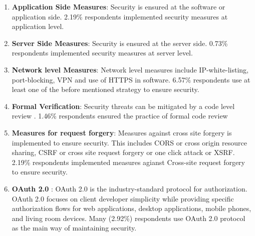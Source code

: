 \begin{enumerate}

    \item \textbf{Application Side Measures}: Security is ensured at the software or application side. 2.19\% respondents implemented security measures at application level.
    
    \item \textbf{Server Side Measures}: Security is ensured at the server side. 0.73\% respondents implemented security measures at server level.
    
    \item \textbf{Network level Measures}: Network level measures include IP-white-listing, port-blocking, VPN and  use of HTTPS  in software. 6.57\% respondents use at least one of the before mentioned strategy to ensure security.
    
    \item \textbf{Formal Verification}: Security threats can be mitigated by  a code level review . 1.46\% respondents ensured the practice of formal code review
    
    \item \textbf{Measures for request forgery}: Measures against cross site forgery is implemented to ensure security. This includes CORS or cross origin resource sharing, CSRF or cross site request forgery or one click attack or XSRF. 2.19\% respondents implemented measures agianst  Cross-site request forgery to ensure security.

    \item \textbf{OAuth 2.0} : OAuth 2.0 is the industry-standard protocol for authorization. OAuth 2.0 focuses on client developer simplicity while providing specific authorization flows for web applications, desktop applications, mobile phones, and living room devices. Many (2.92\%) respondents use OAuth 2.0 protocol as the main way of maintaining security.
    

\end{enumerate}
